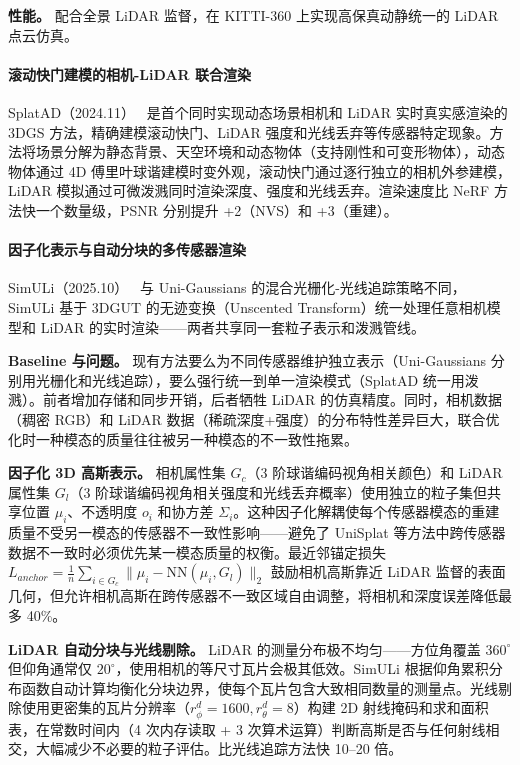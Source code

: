 \textbf{性能。} 配合全景 LiDAR 监督，在 KITTI-360 上实现高保真动静统一的 LiDAR 点云仿真。

\paragraph{滚动快门建模的相机-LiDAR 联合渲染}

SplatAD（2024.11）~\cite{2411_16816} 是首个同时实现动态场景相机和 LiDAR 实时真实感渲染的 3DGS 方法，精确建模滚动快门、LiDAR 强度和光线丢弃等传感器特定现象。方法将场景分解为静态背景、天空环境和动态物体（支持刚性和可变形物体），动态物体通过 4D 傅里叶球谐建模时变外观，滚动快门通过逐行独立的相机外参建模，LiDAR 模拟通过可微泼溅同时渲染深度、强度和光线丢弃。渲染速度比 NeRF 方法快一个数量级，PSNR 分别提升 +2（NVS）和 +3（重建）。

\paragraph{因子化表示与自动分块的多传感器渲染}

SimULi（2025.10）~\cite{2510_12901} 与 Uni-Gaussians 的混合光栅化-光线追踪策略不同，SimULi 基于 3DGUT 的无迹变换（Unscented Transform）统一处理任意相机模型和 LiDAR 的实时渲染——两者共享同一套粒子表示和泼溅管线。

\textbf{Baseline 与问题。} 现有方法要么为不同传感器维护独立表示（Uni-Gaussians 分别用光栅化和光线追踪），要么强行统一到单一渲染模式（SplatAD 统一用泼溅）。前者增加存储和同步开销，后者牺牲 LiDAR 的仿真精度。同时，相机数据（稠密 RGB）和 LiDAR 数据（稀疏深度+强度）的分布特性差异巨大，联合优化时一种模态的质量往往被另一种模态的不一致性拖累。

\textbf{因子化 3D 高斯表示。} 相机属性集 $G_c$（3 阶球谐编码视角相关颜色）和 LiDAR 属性集 $G_l$（3 阶球谐编码视角相关强度和光线丢弃概率）使用独立的粒子集但共享位置 $\mu_i$、不透明度 $o_i$ 和协方差 $\Sigma_i$。这种因子化解耦使每个传感器模态的重建质量不受另一模态的传感器不一致性影响——避免了 UniSplat 等方法中跨传感器数据不一致时必须优先某一模态质量的权衡。最近邻锚定损失 $L_{anchor} = \frac{1}{n}\sum_{i \in G_c} \|\mu_i - \text{NN}(\mu_i, G_l)\|_2$ 鼓励相机高斯靠近 LiDAR 监督的表面几何，但允许相机高斯在跨传感器不一致区域自由调整，将相机和深度误差降低最多 40\%。

\textbf{LiDAR 自动分块与光线剔除。} LiDAR 的测量分布极不均匀——方位角覆盖 $360^\circ$ 但仰角通常仅 $20^\circ$，使用相机的等尺寸瓦片会极其低效。SimULi 根据仰角累积分布函数自动计算均衡化分块边界，使每个瓦片包含大致相同数量的测量点。光线剔除使用更密集的瓦片分辨率（$r_\phi^d = 1600, r_\theta^d = 8$）构建 2D 射线掩码和求和面积表，在常数时间内（4 次内存读取 + 3 次算术运算）判断高斯是否与任何射线相交，大幅减少不必要的粒子评估。比光线追踪方法快 10--20 倍。

